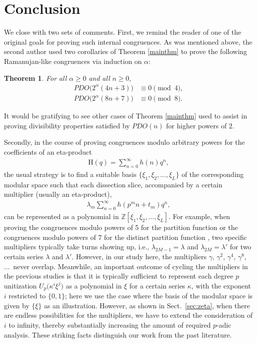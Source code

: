 \documentclass[12pt,reqno]{amsart}
\numberwithin{equation}{section}
\theoremstyle{theorem}
\newtheorem{theorem}{Theorem}
\theoremstyle{definition}
\begin{document}
\section{Conclusion}\label{sec:conclusion}


We close with two sets of comments. First, we remind the reader of one of the original goals for proving such internal congruences.  As was mentioned above, the second author \cite{Sel23} used two corollaries of Theorem \ref{mainthm} to prove the following Ramanujan-like congruences via induction on $\alpha$:
\begin{theorem}
For all $\alpha \geq 0$ and all $n\geq 0,$
\begin{align*}
PDO\big(2^\alpha(4n+3)\big) &\equiv 0 \pmod{4}, \\
PDO\big(2^\alpha(8n+7)\big) &\equiv 0 \pmod{8}.
\end{align*}
\end{theorem}
\noindent It would be gratifying to see other cases of Theorem \ref{mainthm} used to assist in proving divisibility properties satisfied by $PDO(n)$ for higher powers of $2$.

Secondly, in the course of proving congruences modulo arbitrary powers for the coefficients of an eta-product
\begin{align*}
	\mathrm{H}(q) = \sum_{n=0}^\infty h(n)q^n,
\end{align*}
the usual strategy is to find a suitable basis $\{\xi_1,\xi_2,\ldots,\xi_L\}$ of the corresponding modular space such that each dissection slice, accompanied by a certain multiplier (usually an eta-product),
\begin{align*}
	\lambda_m \sum_{n=0}^\infty h(p^m n + t_m) q^n,
\end{align*}
can be represented as a polynomial in $\mathbb{Z}[\xi_1,\xi_2,\ldots,\xi_L]$. For example, when proving the congruences modulo powers of 5 for the partition function \cite{Wat1938} or the congruences modulo powers of $7$ for the distinct partition function \cite{GH1981}, two specific multipliers typically take turns showing up, i.e., $\lambda_{2M-1}=\lambda$ and $\lambda_{2M}=\lambda'$ for two certain series $\lambda$ and $\lambda'$. However, in our study here, the multipliers $\gamma$, $\gamma^2$, $\gamma^4$, $\gamma^8$, $\ldots$~never overlap. Meanwhile, an important outcome of cycling the multipliers in the previous studies is that it is typically sufficient to represent each degree $p$ unitization $U_p\big(\kappa^i \xi^j\big)$ as a polynomial in $\xi$ for a certain series $\kappa$, with the exponent $i$ restricted to $\{0,1\}$; here we use the case where the basis of the modular space is given by $\{\xi\}$ as an illustration. However, as shown in Sect.~\ref{sec:zeta}, when there are endless possibilities for the multipliers, we have to extend the consideration of $i$ to infinity, thereby substantially increasing the amount of required $p$-adic analysis. These striking facts distinguish our work from the past literature.
\end{document}
